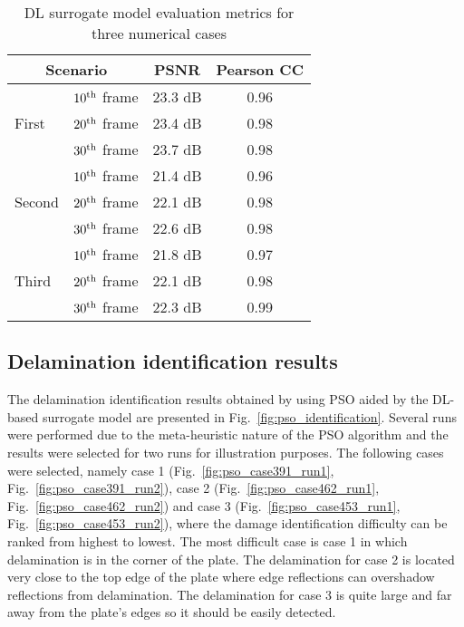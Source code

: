 \documentclass[pdflatex,sn-mathphys-num]{sn-jnl}%
\begin{document}
\begin{table}[h]
	\caption{DL surrogate model evaluation metrics for three numerical cases}
	\label{tab:psnr_pearson}
	\begin{tabular*}{\textwidth}{@{\extracolsep{\fill}}llcc}
		\toprule
		\multicolumn{2}{c}{Scenario} & PSNR    & Pearson CC \\ 
		\midrule
		\multirow{3}{*}{First} & $10\textsuperscript{th}$ frame & 23.3 dB & 
		0.96 \\ 
		& $20\textsuperscript{th}$ frame & 23.4 dB & 0.98 \\ 
		& $30\textsuperscript{th}$ frame & 23.7 dB & 0.98 \\ 
		\midrule
		\multirow{3}{*}{Second} & $10\textsuperscript{th}$ frame & 21.4 dB & 
		0.96 \\ 
		& $20\textsuperscript{th}$ frame & 22.1 dB & 0.98 \\ 
		& $30\textsuperscript{th}$ frame & 22.6 dB & 0.98 \\ 
		\midrule
		\multirow{3}{*}{Third} & $10\textsuperscript{th}$ frame & 21.8 dB & 
		0.97 \\ 
		& $20\textsuperscript{th}$ frame & 22.1 dB & 0.98 \\ 
		& $30\textsuperscript{th}$ frame & 22.3 dB & 0.99 \\ 
		\bottomrule
	\end{tabular*}
\end{table}

	\subsection{Delamination identification results}
	The delamination identification results obtained by using PSO aided by the 
	DL-based surrogate model are presented in Fig.~\ref{fig:pso_identification}.
	Several runs were performed due to the meta-heuristic nature of the PSO 
	algorithm and the results were selected for two runs for illustration 
	purposes.
	The following cases were selected, namely case 1 
	(Fig.~\ref{fig:pso_case391_run1}, Fig.~\ref{fig:pso_case391_run2}), case 2 
	(Fig.~\ref{fig:pso_case462_run1}, Fig.~\ref{fig:pso_case462_run2}) and case 
	3 (Fig.~\ref{fig:pso_case453_run1}, Fig.~\ref{fig:pso_case453_run2}),  
	where the damage identification difficulty can be ranked from highest to 
	lowest.
	The most difficult case is case 1 in which delamination is in the corner of 
	the plate.
	The delamination for case 2 is located very close to the top edge of the 
	plate where edge reflections can overshadow reflections from delamination.
	The delamination for case 3 is quite large and far away from the plate's 
	edges so it should be easily detected.
	
\end{document}
